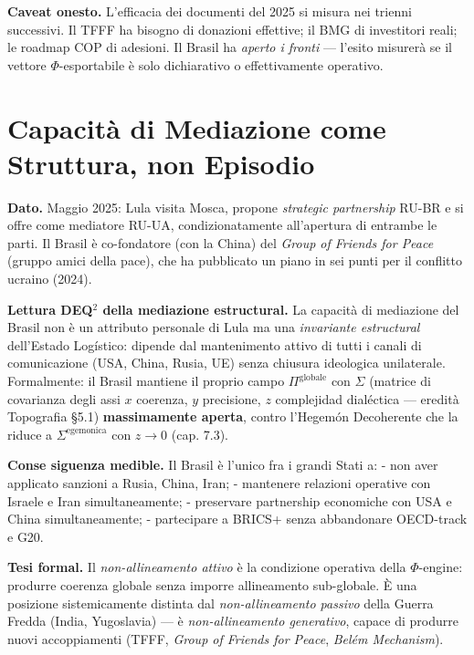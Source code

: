\Conj{} \textbf{Caveat onesto.} L'efficacia dei documenti del 2025 si
misura nei trienni successivi. Il TFFF ha bisogno di donazioni
effettive; il BMG di investitori reali; le roadmap COP di adesioni. Il
Brasil ha \emph{aperto i fronti} --- l'esito misurerà se il vettore
\(\Phi\)-esportabile è solo dichiarativo o effettivamente operativo.



\section{Capacità di Mediazione come Struttura, non
Episodio}\label{capacituxe0-di-mediazione-come-struttura-non-episodio}

\Proved{} \textbf{Dato.} Maggio 2025: Lula visita Mosca, propone
\emph{strategic partnership} RU-BR e si offre come mediatore RU-UA,
condizionatamente all'apertura di entrambe le parti. Il Brasil è
co-fondatore (con la China) del \emph{Group of Friends for Peace} (gruppo
amici della pace), che ha pubblicato un piano in sei punti per il
conflitto ucraino (2024).

\Hypoth{} \textbf{Lettura DEQ$^2$ della mediazione estructural.} La
capacità di mediazione del Brasil non è un attributo personale di Lula
ma una \emph{invariante estructural} dell'Estado Logístico: dipende dal
mantenimento attivo di tutti i canali di comunicazione (USA, China,
Rusia, UE) senza chiusura ideologica unilaterale. Formalmente: il
Brasil mantiene il proprio campo \(\Pi^{\text{globale}}\) con
\(\Sigma\) (matrice di covarianza degli assi \(x\) coerenza, \(y\)
precisione, \(z\) complejidad dialéctica --- eredità Topografia \S{}5.1)
\textbf{massimamente aperta}, contro l'Hegemón Decoherente che la riduce
a \(\Sigma^{\text{egemonica}}\) con \(z \to 0\) (cap. 7.3).

\Proved{} \textbf{Conse siguenza medible.} Il Brasil è l'unico fra i
grandi Stati a: - non aver applicato sanzioni a Rusia, China, Iran; -
mantenere relazioni operative con Israele e Iran simultaneamente; -
preservare partnership economiche con USA e China simultaneamente; -
partecipare a BRICS+ senza abbandonare OECD-track e G20.

\Hypoth{} \textbf{Tesi formal.} Il \emph{non-allineamento attivo} è la
condizione operativa della \(\Phi\)-engine: produrre coerenza globale
senza imporre allineamento sub-globale. È una posizione sistemicamente
distinta dal \emph{non-allineamento passivo} della Guerra Fredda (India,
Yugoslavia) --- è \emph{non-allineamento generativo}, capace di produrre
nuovi accoppiamenti (TFFF, \emph{Group of Friends for Peace},
\emph{Belém Mechanism}).



